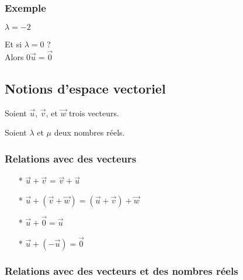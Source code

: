 \subsubsection{Exemple }

$\lambda = -2 $


Et si $\lambda = 0$ ? \\

Alors $0\overrightarrow{u} = \overrightarrow{0}$

\subsection{Notions d'espace vectoriel}

Soient $\overrightarrow{u}$, $\overrightarrow{v}$, et  $\overrightarrow{w}$ trois vecteurs.

Soient $\lambda$ et $\mu$ deux nombres réels. \\

\subsubsection{Relations avec des vecteurs}

\begin{itemize}
\item[*] $\overrightarrow{u} + \overrightarrow{v}$ = $\overrightarrow{v} + \overrightarrow{u}$
\item[*] $\overrightarrow{u} + \left(\overrightarrow{v} + \overrightarrow{w} \right) = \left( \overrightarrow{u} + \overrightarrow{v} \right) + \overrightarrow{w}$
\item[*] $\overrightarrow{u} + \overrightarrow{0} = \overrightarrow{u}$
\item[*] $\overrightarrow{u} + \left(-\overrightarrow{u}\right) = \overrightarrow{0}$
\end{itemize}

\subsubsection{Relations avec des vecteurs et des nombres réels}

